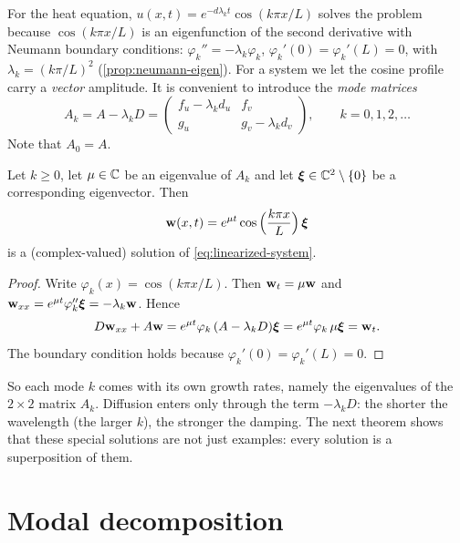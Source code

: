 For the heat equation, $u(x,t)=e^{-d\lambda_k t}\cos(k\pi x/L)$ solves the problem
because $\cos(k\pi x/L)$ is an eigenfunction of the second derivative with Neumann
boundary conditions: $\varphi_k''=-\lambda_k\varphi_k$, $\varphi_k'(0)=\varphi_k'(L)=0$,
with $\lambda_k=(k\pi/L)^2$ (\cref{prop:neumann-eigen}). For a system we let the
cosine profile carry a \emph{vector} amplitude. It is convenient to introduce the
\emph{mode matrices}
\begin{equation*}
  A_k = A-\lambda_k D
  = \begin{pmatrix} f_u-\lambda_k d_u & f_v\\ g_u & g_v-\lambda_k d_v\end{pmatrix},
  \qquad k=0,1,2,\dots
\end{equation*}
Note that $A_0=A$.

\begin{proposition}\label{prop:normal-modes}
Let $k\ge0$, let $\mu\in\mathbb{C}$ be an eigenvalue of $A_k$ and let $\boldsymbol{\xi}\in\mathbb{C}^2\setminus\{0\}$
be a corresponding eigenvector. Then
\begin{equation*}
  \mathbf{w}(x,t) = e^{\mu t}\cos\Big(\frac{k\pi x}{L}\Big)\,\boldsymbol{\xi}
\end{equation*}
is a (complex-valued) solution of \eqref{eq:linearized-system}.
\end{proposition}

\begin{proof}
Write $\varphi_k(x)=\cos(k\pi x/L)$. Then $\mathbf{w}_t=\mu\mathbf{w}$ and
$\mathbf{w}_{xx}=e^{\mu t}\varphi_k''\boldsymbol{\xi}=-\lambda_k\mathbf{w}$. Hence
\begin{equation*}
  D\mathbf{w}_{xx}+A\mathbf{w} = e^{\mu t}\varphi_k\,(A-\lambda_kD)\boldsymbol{\xi}
  = e^{\mu t}\varphi_k\,\mu\boldsymbol{\xi} = \mathbf{w}_t .
\end{equation*}
The boundary condition holds because $\varphi_k'(0)=\varphi_k'(L)=0$.
\end{proof}

So each mode $k$ comes with its own growth rates, namely the eigenvalues of the
$2\times2$ matrix $A_k$. Diffusion enters only through the term $-\lambda_kD$: the
shorter the wavelength (the larger $k$), the stronger the damping. The next theorem
shows that these special solutions are not just examples: every solution is a
superposition of them.

\section{Modal decomposition}\label{sec:turing-decomposition}

